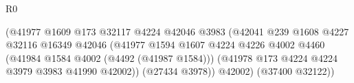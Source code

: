\begin{lexlean}{R0}
\begin{coremodule}
                                                            (@41977
                                                              @1609
                                                              @173
                                                              @32117
                                                              @4224
                                                              @42046
                                                              @3983
                                                              (@42041
                                                                @239
                                                                @1608
                                                                @4227
                                                                @32116
                                                                @16349
                                                                @42046
                                                                (@41977
                                                                  @1594
                                                                  @1607
                                                                  @4224
                                                                  @4226
                                                                  @4002
                                                                  @4460
                                                                  (@41984
                                                                    @1584
                                                                    @4002
                                                                    (@4492 (@41987 @1584)))
                                                                  (@41978
                                                                    @173
                                                                    @4224
                                                                    @4224
                                                                    @3979
                                                                    @3983
                                                                    @41990
                                                                    @42002))
                                                                (@27434 @3978))
                                                              @42002)
                                                            (@37400 @32122))

\end{coremodule}
\end{lexlean}

